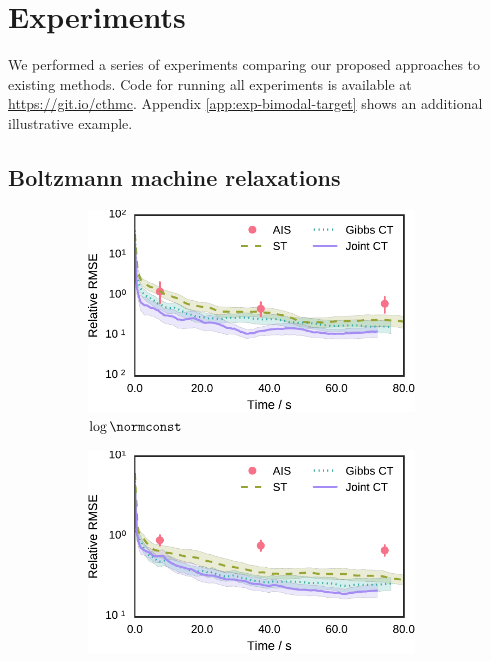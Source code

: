 \section{Experiments}\label{sec:experiments}

We performed a series of experiments comparing our proposed approaches to existing methods. Code for running all experiments is available at \url{https://git.io/cthmc}. Appendix \ref{app:exp-bimodal-target} shows an additional illustrative example.

\subsection{Boltzmann machine relaxations}\label{subsec:exp-bm-relaxations}

\begin{figure}[t]
\centering
\begin{subfigure}[b]{.33\linewidth}
\vskip 0pt
\centering
\includegraphics[width=0.95\textwidth]{images/continuous-tempering/gaussian-bm-relaxation-30-unit-scale-6-log-norm-rmses-t2} 
\caption{$\log \normconst$}\label{sfig:bmr-30-unit-scale-6-log-norm}
\end{subfigure}%
\begin{subfigure}[b]{.33\linewidth}
\vskip 0pt
\centering
\includegraphics[width=0.95\textwidth]{images/continuous-tempering/gaussian-bm-relaxation-30-unit-scale-6-mean-rmses-t2}

\end{subfigure}
\end{figure}
